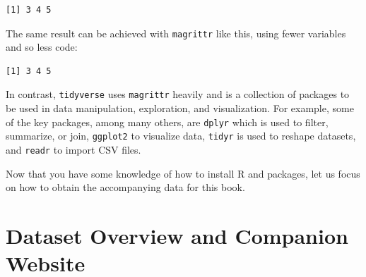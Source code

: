 \begin{verbatim}
[1] 3 4 5
\end{verbatim}

The same result can be achieved with \texttt{magrittr} like this, using fewer variables and so less code:

\begin{Shaded}
\begin{Highlighting}[]

\OtherTok{\textless{}{-}} \NormalTok{(}\NormalTok{, }\NormalTok{, }\NormalTok{, }\NormalTok{, }\NormalTok{)}

\OtherTok{\textless{}{-}}\SpecialCharTok{\%\textgreater{}\%}
  \NormalTok{() }\SpecialCharTok{\%\textgreater{}\%}               
  \NormalTok{(}\NormalTok{) }\SpecialCharTok{\%\textgreater{}\%}             
\NormalTok{  .[. }\SpecialCharTok{\textgreater{}} \NormalTok{]                 }

\end{Highlighting}
\end{Shaded}

\begin{verbatim}
[1] 3 4 5
\end{verbatim}

In contrast, \texttt{tidyverse} uses \texttt{magrittr} heavily and is a collection of packages to be used in data manipulation, exploration, and visualization. For example, some of the key packages, among many others, are \texttt{dplyr} which is used to filter, summarize, or join, \texttt{ggplot2} to visualize data, \texttt{tidyr} is used to reshape datasets, and \texttt{readr} to import CSV files.

Now that you have some knowledge of how to install R and packages, let us focus on how to obtain the accompanying data for this book.

\section{Dataset Overview and Companion
Website}\label{dataset-overview-and-companion-website}

